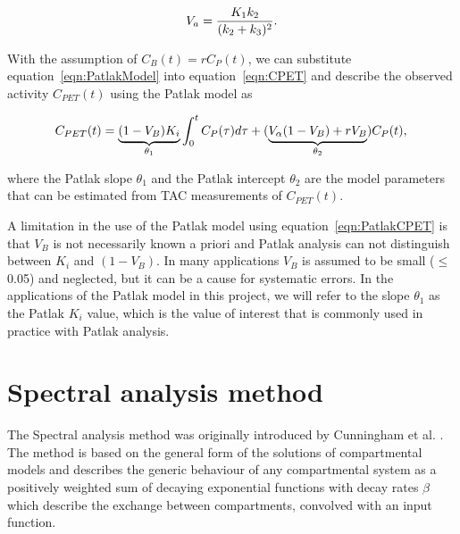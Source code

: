 \begin{equation} 
V_a  = \frac{K_1 k_2}{(k_2+k_3)^2} \\ . \\ 
\end{equation}

With the assumption of $C_{B}(t) = r C_{P}(t)$, we can substitute equation~\ref{eqn:PatlakModel} into equation~\ref{eqn:CPET} and describe the observed activity $C_{PET}(t)$ using the Patlak model as

\begin{equation} 
{C_{PET}}(t)  = \underbrace{(1-V_{B})K_i}_{\theta_1} \int_{0}^{t} C_{P}(\tau) d\tau +  (\underbrace{V_{\alpha}(1-V_{B})+r V_{B}}_{\theta_2}) C_{P}(t) \\ , \\
\label{eqn:PatlakCPET}
\end{equation}

where the Patlak slope $\theta_1$ and the Patlak intercept $\theta_2$ are the model parameters that can be estimated from TAC measurements of ${C_{PET}}(t)$. 

A limitation in the use of the Patlak model using equation~\ref{eqn:PatlakCPET} is that $V_B$ is not necessarily known a priori and Patlak analysis can not distinguish between $K_i$ and $(1-V_B)$. In many applications $V_B$ is assumed to be small ($\leq$0.05) and neglected, but it can be a cause for systematic errors. 
In the applications of the Patlak model in this project, we will refer to the slope $\theta_1$ as the Patlak $K_i$ value, which is the value of interest that is commonly used in practice with Patlak analysis.


\section{Spectral analysis method}
The Spectral analysis method was originally introduced by Cunningham et al. \cite{Cunningham1993}. The method is based on the general form of the solutions of compartmental models and describes the generic behaviour of any compartmental system as a positively weighted sum of decaying exponential functions with decay rates $\beta$ which describe the exchange between compartments, convolved with an input function. 

